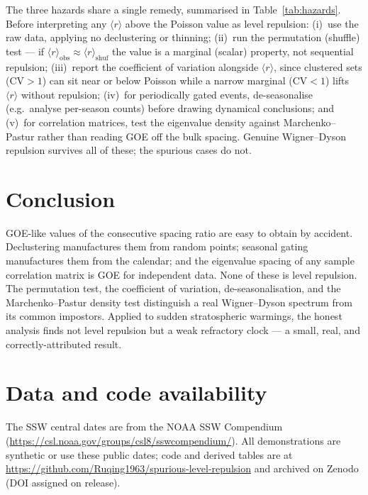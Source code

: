 \documentclass[11pt]{article}
\newcommand{\rr}{\langle r\rangle}
\begin{document}
The three hazards share a single remedy, summarised in Table~\ref{tab:hazards}.
Before interpreting any $\rr$ above the Poisson value as level repulsion: (i)~use
the raw data, applying no declustering or thinning; (ii)~run the permutation
(shuffle) test --- if $\rr_{\mathrm{obs}}\approx\rr_{\mathrm{shuf}}$ the value is a
marginal (scalar) property, not sequential repulsion; (iii)~report the
coefficient of variation alongside $\rr$, since clustered sets ($\mathrm{CV}>1$)
can sit near or below Poisson while a narrow marginal ($\mathrm{CV}<1$) lifts
$\rr$ without repulsion; (iv)~for periodically gated events, de-seasonalise (e.g.\
analyse per-season counts) before drawing dynamical conclusions; and (v)~for
correlation matrices, test the eigenvalue density against Marchenko--Pastur
rather than reading GOE off the bulk spacing. Genuine Wigner--Dyson repulsion
survives all of these; the spurious cases do not.

\section{Conclusion}

GOE-like values of the consecutive spacing ratio are easy to obtain by accident.
Declustering manufactures them from random points; seasonal gating manufactures
them from the calendar; and the eigenvalue spacing of any sample correlation
matrix is GOE for independent data. None of these is level repulsion. The
permutation test, the coefficient of variation, de-seasonalisation, and the
Marchenko--Pastur density test distinguish a real Wigner--Dyson spectrum from its
common impostors. Applied to sudden stratospheric warmings, the honest analysis
finds not level repulsion but a weak refractory clock --- a small, real, and
correctly-attributed result.

\section*{Data and code availability}
The SSW central dates are from the NOAA SSW Compendium \citep{butler2017}
(\url{https://csl.noaa.gov/groups/csl8/sswcompendium/}). All demonstrations are
synthetic or use these public dates; code and derived tables are at
\url{https://github.com/Ruqing1963/spurious-level-repulsion} and archived on
Zenodo (DOI assigned on release).
\end{document}
